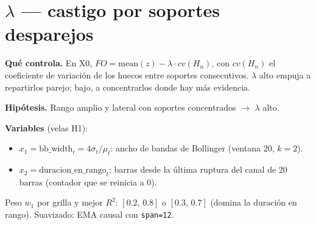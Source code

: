 \documentclass[11pt,a4paper]{article}
\newcommand{\code}[1]{\texttt{\small #1}}
\begin{document}
\section*{$\lambda$ --- castigo por soportes desparejos}

\textbf{Qué controla.} En X0, $FO=\text{mean}(z)-\lambda\cdot cv(H_n)$, con $cv(H_n)$ el coeficiente de variación de los huecos entre soportes consecutivos. $\lambda$ alto empuja a repartirlos parejo; bajo, a concentrarlos donde hay más evidencia.

\textbf{Hipótesis.} Rango amplio y lateral con soportes concentrados $\rightarrow$ $\lambda$ alto.

\textbf{Variables} (velas H1):
\begin{itemize}\setlength{\itemsep}{1pt}\setlength{\topsep}{1pt}
\item $x_1=\text{bb\_width}_t=4\sigma_t/\mu_t$: ancho de bandas de Bollinger (ventana 20, $k=2$).
\item $x_2=\text{duracion\_en\_rango}_t$: barras desde la última ruptura del canal de 20 barras (contador que se reinicia a 0).
\end{itemize}
Peso $w_1$ por grilla y mejor $R^2$: $[0.2,\,0.8]$ o $[0.3,\,0.7]$ (domina la duración en rango). Suavizado: EMA causal con \code{span=12}.
\end{document}
